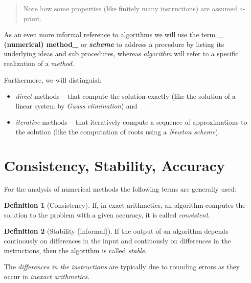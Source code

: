 \documentclass[
]{book}
\providecommand{\tightlist}{%
  \setlength{\itemsep}{0pt}\setlength{\parskip}{0pt}}
\newenvironment {JHSAYS} [0] {\begin{quote}\color{jhsc}} {\end{quote}}
\theoremstyle{definition}
\newtheorem{definition}{Definition}[chapter]
\theoremstyle{definition}
\theoremstyle{definition}
\theoremstyle{definition}
\theoremstyle{remark}
\begin{document}
\leavevmode\hypertarget{rem-coors}{}%
\begin{JHSAYS}
Note how some properties (like finitely many instructions) are assumed a-priori.

\end{JHSAYS}

As an even more informal reference to algorithms we will use the term \textbf{\_ (numerical) method\_} or \textbf{\emph{scheme}} to address a procedure by listing its underlying ideas and sub procedures, whereas \emph{algorithm} will refer to a specific realization of a \emph{method}.

Furthermore, we will distinguish

\begin{itemize}
\tightlist
\item
  \emph{direct} methods -- that compute the solution exactly (like the solution of a linear system by \emph{Gauss elimination}) and
\item
  \emph{iterative} methods -- that iteratively compute a sequence of approximations to the solution (like the computation of roots using a \emph{Newton scheme}).
\end{itemize}

\hypertarget{consistency-stability-accuracy}{%
\section{Consistency, Stability, Accuracy}\label{consistency-stability-accuracy}}

For the analysis of numerical methods the following terms are generally used:

\begin{definition}[Consistency]
\protect\hypertarget{def:consistency}{}\label{def:consistency}If, in exact arithmetics, an algorithm computes the solution to the problem with a given accuracy, it is called \emph{consistent}.
\end{definition}

\begin{definition}[Stability (informal)]
\protect\hypertarget{def:stability}{}\label{def:stability}If the output of an algorithm depends continously on differences in the input and continously on differences in the instructions, then the algorithm is called \emph{stable}.
\end{definition}

The \emph{differences in the instructions} are typically due to rounding errors as they occur in \emph{inexact arithmetics}.
\end{document}
